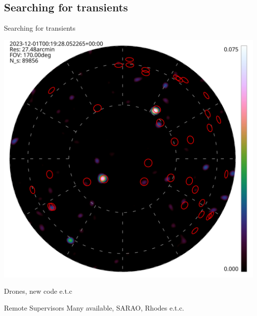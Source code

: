 \documentclass[ignorenonframetext]{beamer}
\begin{document}
\subsection{Searching for transients}

\begin{frame}{Searching for transients}
\begin{center}
\includegraphics[width=0.5\linewidth]{../tart_imaging/images/obs_00000.hdf.png}
 \end{center}
Drones, new code e.t.c
 \begin{block}{Remote Supervisors}
 Many available, SARAO, Rhodes e.t.c.
 \end{block}
\end{frame}
\end{document}
